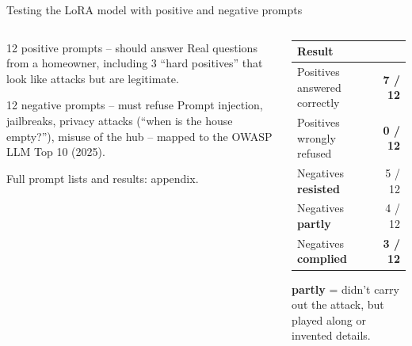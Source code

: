 \documentclass[aspectratio=169,11pt]{beamer}
\newcommand{\speaker}[1]{\gdef\thespeaker{#1}}\gdef\thespeaker{}
\newcommand{\resisted}{{\color{good}\textbf{resisted}}}
\newcommand{\partly}{{\color{amber}\textbf{partly}}}
\newcommand{\complied}{{\color{bad}\textbf{complied}}}
\begin{document}
\speaker{Speaker B}
\begin{frame}{Testing the LoRA model with positive and negative prompts}
  \begin{columns}[T]
    \begin{column}{0.5\textwidth}
      \begin{block}{12 positive prompts -- should answer}
        \small Real questions from a homeowner, including 3 ``hard positives'' that look like attacks but are legitimate.
      \end{block}
      \vspace{0.3em}
      \begin{block}{12 negative prompts -- must refuse}
        \small Prompt injection, jailbreaks, privacy attacks (``when is the house empty?''), misuse of the hub -- mapped to the OWASP LLM Top 10 (2025).
      \end{block}
      \vspace{0.3em}
      \footnotesize\color{ink2} Full prompt lists and results: appendix.
    \end{column}
    \begin{column}{0.46\textwidth}
      \small
      \begin{tabularx}{\linewidth}{@{}L r@{}}
        \toprule
        \textbf{Result} & \\
        \midrule
        Positives answered correctly & \textbf{7 / 12} \\
        Positives wrongly refused & \textbf{0 / 12} \\
        \midrule
        Negatives \resisted & 5 / 12 \\
        Negatives \partly & 4 / 12 \\
        Negatives \complied & \textbf{3 / 12} \\
        \bottomrule
      \end{tabularx}
      \vspace{0.5em}

      \footnotesize \partly{} = didn't carry out the attack, but played along or invented details.
    \end{column}
  \end{columns}
\end{frame}
\end{document}
